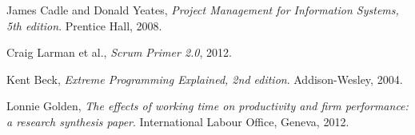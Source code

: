 \begin{thebibliography}{9}
	  James Cadle and Donald Yeates,
	  \emph{Project Management for Information Systems, 5th edition}.
	  Prentice Hall,
	  2008.

    Craig Larman et al.,
    \emph{Scrum Primer 2.0},
    2012.
    
    Kent Beck,
    \emph{Extreme Programming Explained, 2nd edition}.
    Addison-Wesley,
    2004.
    
    Lonnie Golden,
    \emph{The effects of working time on productivity and firm performance: a research synthesis paper}.
    International Labour Office, Geneva,
    2012.
    
\end{thebibliography}